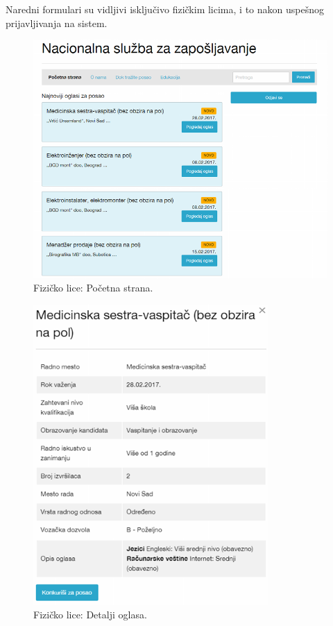 Naredni formulari su vidljivi isklju\v civo fizi\v ckim licima, i to nakon uspe\v snog prijavljivanja na sistem.

\begin{figure}[H]
	\centering
	\includegraphics[width=\textwidth]{korisnicki-interfejs/slike/fl-index.png}
	\caption{Fizi\v cko lice: Po\v cetna strana.}
	\label{for: fl-index}
\end{figure}

\begin{figure}[H]
	\centering
	\includegraphics[width=0.8\textwidth]{korisnicki-interfejs/slike/fl-detaljiOglasa.png}
	\caption{Fizi\v cko lice: Detalji oglasa.}
	\label{for: fl-detaljiOglasa}
\end{figure}

